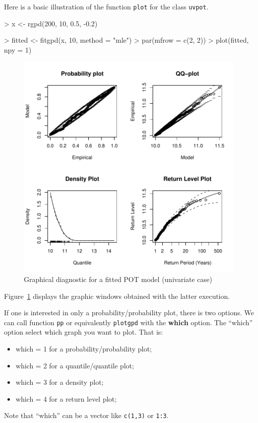 \documentclass[a4paper]{article}
\numberwithin{equation}{section}
\theoremstyle{definition}
\begin{document}
Here is a basic illustration of the function \verb|plot| for the class
\verb|uvpot|.
\begin{Schunk}
\begin{Sinput}
> x <- rgpd(200, 10, 0.5, -0.2)
\end{Sinput}
\end{Schunk}

\begin{Schunk}
\begin{Sinput}
> fitted <- fitgpd(x, 10, method = "mle")
> par(mfrow = c(2, 2))
> plot(fitted, npy = 1)
\end{Sinput}
\end{Schunk}

\begin{figure}
\centering
\includegraphics{guide-028}
\caption{Graphical diagnostic for a fitted POT model (univariate
  case)} 
\label{fig:plotgpd}
\end{figure}

Figure~\ref{fig:plotgpd} displays the graphic windows obtained with
the latter execution.

If one is interested in only a probability/probability plot, there is
two options. We can call function \verb|pp| or equivalently
\verb|plotgpd| with the \textbf{which} option. The ``which'' option
select which graph you want to plot. That is:
\begin{itemize}
\item{which = 1} for a probability/probability plot;
\item{which = 2} for a quantile/quantile plot;
\item{which = 3} for a density plot;
\item{which = 4} for a return level plot;
\end{itemize}
Note that ``which'' can be a vector like \verb|c(1,3)| or \verb|1:3|.
\end{document}
